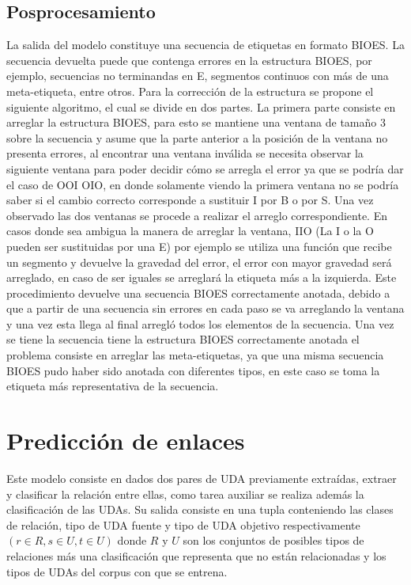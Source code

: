 \subsection{Posprocesamiento}

La salida del modelo constituye una secuencia de etiquetas en formato BIOES. La secuencia devuelta puede que contenga
errores en la estructura BIOES, por ejemplo, secuencias no terminandas en E, segmentos continuos con más de una meta-etiqueta,
entre otros.
Para la corrección de la estructura se propone el siguiente algoritmo, el cual se divide en dos partes. La primera
parte consiste en arreglar la estructura BIOES, para esto se mantiene una ventana de tamaño
3 sobre la secuencia y asume que la parte anterior a la posición de la ventana no presenta errores, al encontrar una
ventana inválida se necesita observar la siguiente ventana para poder decidir cómo se arregla el error ya que se
podría dar el caso de OOI OIO, en donde solamente viendo la primera ventana no se podría saber si el cambio 
correcto corresponde a sustituir I por B o por S. Una vez observado las dos ventanas se procede a realizar el 
arreglo correspondiente. En casos donde sea ambigua la manera de arreglar la ventana, IIO (La I o la O pueden ser 
sustituidas por una E) por ejemplo se utiliza una función que recibe un segmento y devuelve la gravedad del error,
el error con mayor gravedad será arreglado, en caso de ser iguales se arreglará la etiqueta más a la izquierda.
Este procedimiento devuelve una secuencia BIOES correctamente anotada, debido a que a partir de una secuencia sin 
errores en cada paso se va arreglando la ventana y una vez esta llega al final arregló todos los elementos de la secuencia.
Una vez se tiene la secuencia tiene la estructura BIOES correctamente anotada el problema
consiste en arreglar las meta-etiquetas, ya que una misma secuencia BIOES pudo haber sido anotada con diferentes
tipos, en este caso se toma la etiqueta más representativa de la secuencia.

\section{Predicción de enlaces}

Este modelo consiste en dados dos pares de UDA previamente extraídas, 
extraer y clasificar la relación entre ellas, como tarea auxiliar se realiza además la clasificación 
de las UDAs. Su salida consiste en una tupla conteniendo las clases de relación, tipo de UDA fuente y 
tipo de UDA objetivo respectivamente $(r \in R, s \in U, t \in U)$ donde $R$ y $U$ son los conjuntos de 
posibles tipos de relaciones más una clasificación que representa que no están relacionadas y los tipos de UDAs 
del corpus con que se entrena.

